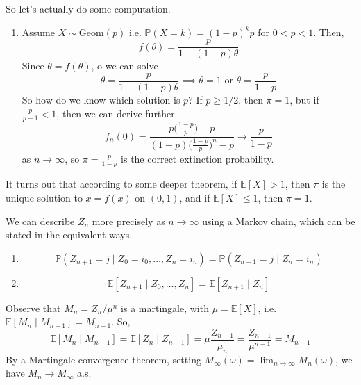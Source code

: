 \begin{example}
    So let's actually do some computation. 
    \begin{enumerate}
      \item Assume $X \sim \mathrm{Geom}(p)$ i.e. $\mathbb{P}(X = k) = (1 - p)^k p$ for $0 < p < 1$. Then, 
        \begin{equation}
          f(\theta) = \frac{p}{1 - (1 - p)\theta} 
        \end{equation}
        Since $\theta = f (\theta)$, o we can solve 
        \begin{equation}
          \theta = \frac{p}{1 - (1 - p) \theta} \implies \theta = 1 \text{ or } \theta = \frac{p}{1 - p}
        \end{equation}
        So how do we know which solution is $p$? If $p \geq 1/2$, then $\pi = 1$, but if $\frac{p}{p - 1} < 1$, then we can derive further 
        \begin{equation}
          f_n (0) = \frac{p \big(\frac{1 - p}{p} \big) - p}{(1 - p) \big( \frac{1 - p}{p} \big)^n - p} \to \frac{p}{1 - p}
        \end{equation}
        as $n \to \infty$, so $\pi = \frac{p}{1 - p}$ is the correct extinction probability. 
    \end{enumerate}
    It turns out that according to some deeper theorem, if $\mathbb{E}[X] > 1$, then $\pi$ is the unique solution to $x = f(x)$ on $(0, 1)$, and if $\mathbb{E}[X] \leq 1$, then $\pi = 1$. 
  \end{example}

  \begin{example}
    \label{ex:branching-process-as-a-markov-chain}
    We can describe $Z_n$ more precisely as $n \to \infty$ using a Markov chain, which can be stated in the equivalent ways. 
    \begin{enumerate}
      \item 
        \begin{equation}
          \mathbb{P}(Z_{n+1} = j \mid Z_0 = i_0, \ldots, Z_n = i_n) = \mathbb{P}(Z_{n+1} = j \mid Z_n = i_n)
        \end{equation} 

      \item 
        \begin{equation}
          \mathbb{E}[Z_{n+1} \mid Z_0, \ldots, Z_n] = \mathbb{E}[Z_{n+1} \mid Z_n] 
        \end{equation}
    \end{enumerate}

    Observe that $M_n = Z_n / \mu^n$ is a \hyperref[def:martingale]{martingale}, with $\mu = \mathbb{E}[X]$, i.e. $\mathbb{E}[M_n \mid M_{n-1}] = M_{n-1}$. So, 
    \begin{equation}
      \mathbb{E}[M_n \mid M_{n-1}] = \mathbb{E}[Z_n \mid Z_{n-1}] = \mu \frac{Z_{n-1}}{\mu_n} = \frac{Z_{n-1}}{\mu^{n-1}} = M_{n-1}
    \end{equation}
    By a Martingale convergence theorem, setting $M_\infty (\omega) = \lim_{n \to \infty} M_n (\omega)$, we have $M_n \to M_\infty$ a.s. 
  \end{example}


